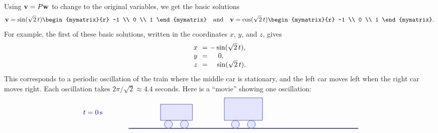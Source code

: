 \begin{solution}
\begin{itemize}
    Using $\mbox{\bf v} = P\mbox{\bf w}$ to change to the original variables,
    we get the basic solutions
    \begin{equation*}
      \vect{v} 
      = \sin(\sqrt{2}\,t)\begin{mymatrix}{r} -1 \\ 0 \\ 1 \end{mymatrix}
      \quad\mbox{and}\quad
      \vect{v}
      = \cos(\sqrt{2}\,t)\begin{mymatrix}{r} -1 \\ 0 \\ 1 \end{mymatrix}.
    \end{equation*}
    For example, the first of these basic solutions, written in the
    coordinates $x$, $y$, and $z$, gives
    \begin{equation*}
      \begin{array}{c@{~~}c@{~}l}
        x &=& -\sin(\sqrt{2}\,t), \\
        y &=& ~~~\,0, \\
        z &=& ~~~\sin(\sqrt{2}\,t). \\
      \end{array}
    \end{equation*}
    This corresponds to a periodic oscillation of the train where the
    middle car is stationary, and the left car moves left when the
    right car moves right. Each oscillation takes
    $2\pi/\sqrt{2}\approx 4.4$ seconds.  Here is a ``movie'' showing
    one oscillation:
    \begin{equation*}
      \begin{tikzpicture}[scale=0.8, color=blue!50!black]
        \begin{scope}[yshift=0cm]
          \draw (-3,1) node[right] {$t=0\s$};
          \draw[thick] (0,0) -- (14.4,0);
          \begin{scope}[xshift=0cm]
            \draw[fill=blue!10] (2,0.5) rectangle (4,1.5);
            \draw[fill=blue!10] (2.5,0.25) circle (0.25);
            \draw[fill=blue!10] (3.5,0.25) circle (0.25);
          \end{scope}
          \begin{scope}[xshift=4.2cm]
            \draw[fill=blue!10] (1.8,0.5) rectangle (4.2,1.9);
            \draw[fill=blue!10] (2.5,0.25) circle (0.25);
            \draw[fill=blue!10] (3.5,0.25) circle (0.25);
          \end{scope}
          \begin{scope}[xshift=8.4cm]

\end{scope}
\end{scope}
\end{tikzpicture}
\end{equation*}
\end{itemize}
\end{solution}
